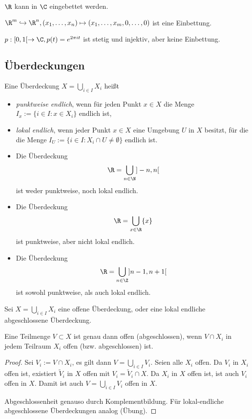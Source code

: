 \begin{ex}
	$\R$ kann in $\C$ eingebettet werden.
\end{ex}


\begin{ex}
	$\R^m \injto \R^n, (x_1, \dotsc, x_n) \mapsto (x_1, \dotsc, x_m, 0, \dotsc, 0)$ ist eine Einbettung.

	$p: [0,1[ \to \C, p(t) = e^{2\pi i t}$ ist stetig und injektiv, aber keine Einbettung.
\end{ex}

\subsection{Überdeckungen}

\begin{df}
	Eine Überdeckung $X = \bigcup_{i\in I} X_i$ heißt
	\begin{itemize}
		\item
			\emph{punktweise endlich}, wenn für jeden Punkt $x \in X$ die Menge $I_x := \{ i \in I : x \in X_i \}$ endlich ist,
		\item
			\emph{lokal endlich}, wenn jeder Punkt $x \in X$ eine Umgebung $U$ in $X$ besitzt, für die die Menge $I_U := \{ i \in I : X_i \cap U \neq \emptyset \}$ endlich ist.
	\end{itemize}
\end{df}

\begin{ex}
	\begin{itemize}
		\item
			Die Überdeckung
			\[
				\R = \bigcup_{n \in \N} ]-n, n[
			\]
			ist weder punktweise, noch lokal endlich.
		\item
			Die Überdeckung
			\[
				\R = \bigcup_{x \in \R} \{x\}
			\]
			ist punktweise, aber nicht lokal endlich.
		\item
			Die Überdeckung
			\[
				\R = \bigcup_{n\in \Z} ]n-1, n+ 1[
			\]
			ist sowohl punktweise, als auch lokal endlich.
	\end{itemize}
\end{ex}

\begin{st} %
	Sei $X = \bigcup_{i\in I} X_i$ eine offene Überdeckung, oder eine lokal endliche abgeschlossene Überdeckung.

	Eine Teilmenge $V \subset X$ ist genau dann offen (abgeschlossen), wenn $V \cap X_i$ in jedem Teilraum $X_i$ offen (bzw. abgeschlossen) ist.
	\begin{proof}
		Sei $V_i := V \cap X_i$, es gilt dann $V = \bigcup_{i\in I} V_i$.
		Seien alle $X_i$ offen.
		Da $V_i$ in $X_i$ offen ist, existiert $\tilde V_i$ in $X$ offen mit $V_i = \tilde V_i \cap X$.
		Da $X_i$ in $X$ offen ist, ist auch $V_i$ offen in $X$.
		Damit ist auch $V = \bigcup_{i\in I} V_i$ offen in $X$.

		Abgeschlossenheit genauso durch Komplementbildung.
		Für lokal-endliche abgeschlossene Überdeckungen analog (Übung). %
	\end{proof}
\end{st}

